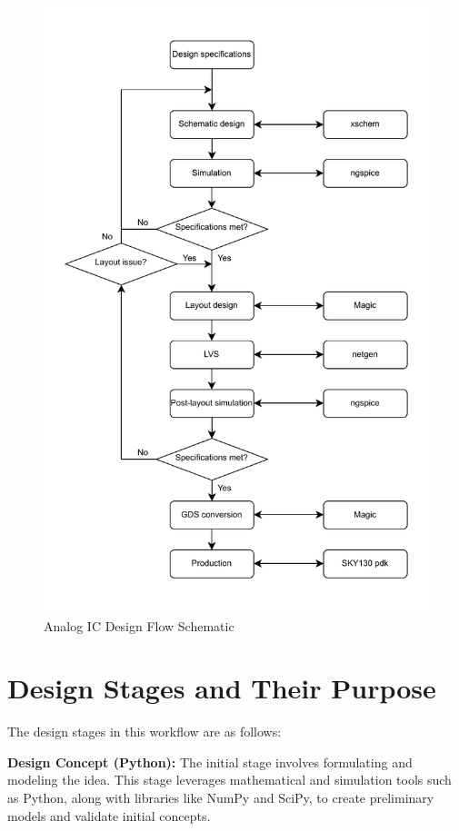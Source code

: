 \begin{figure}[ht!]
\centering
\includegraphics[width=\textwidth]{Figures/Workflow.drawio.pdf}
\caption{Analog IC Design Flow Schematic}
\label{fig:workflow_schematic}
\end{figure}


\section{Design Stages and Their Purpose}

The design stages in this workflow are as follows:

\textbf{Design Concept (Python):}
The initial stage involves formulating and modeling the idea. This stage leverages mathematical and simulation tools such as Python, along with libraries like NumPy and SciPy, to create preliminary models and validate initial concepts.

